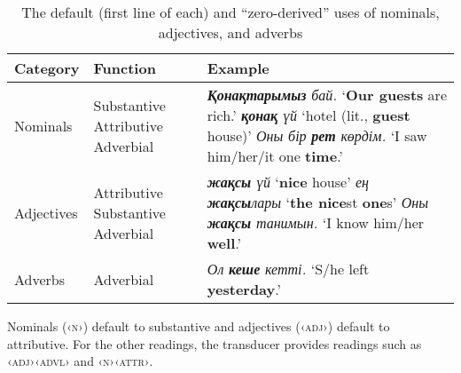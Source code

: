 \documentclass[a4paper,11pt, onecolumn,twoside]{article}
\newcommand{\kazakh}[1]{{\em #1}}
\newcommand{\gloss}[1]{`#1'}
\newcommand{\tag}[1]{{\ll \textsc{‹#1›}}}
\begin{document}
\begin{table}[htbp]
	\centering
	\caption{The default (first line of each) and ``zero-derived'' uses of nominals, adjectives, and adverbs}\label{tab:zeroderiv}
	\begin{tabular}{lp{5em}p{20em}}
		\toprule
			\textbf{Category} & \textbf{Function} & \textbf{Example} \\
		\midrule
			Nominals & Substantive\newline
							Attributive\newline
							Adverbial
						& \kazakh{\textbf{Қонақтарымыз} бай.} \gloss{\textbf{Our guests} are rich.}\newline 
							\kazakh{\textbf{қонақ} үй} \gloss{hotel (lit., \textbf{guest} house)}\newline
							\kazakh{Оны бір \textbf{рет} көрдім.} \gloss{I saw him/her/it one \textbf{time}.} \\\midrule
			Adjectives & Attributive\newline
							Substantive\newline
							Adverbial
						& \kazakh{\textbf{жақсы} үй} \gloss{\textbf{nice} house} \newline
						\kazakh{ең \textbf{жақсы}лары} \gloss{\textbf{the nice}st \textbf{one}s} \newline
						\kazakh{Оны \textbf{жақсы} танимын.} \gloss{I know him/her \textbf{well}.}
						\\\midrule
			Adverbs & Adverbial
						& \kazakh{Ол \textbf{кеше} кетті.} \gloss{S/he left \textbf{yesterday}.}
						\\
		\bottomrule
	\end{tabular}

\end{table}

Nominals (\tag{n}) default to substantive and adjectives (\tag{adj}) default to attributive.  For the other readings, the transducer provides readings such as \tag{adj}\tag{advl} and \tag{n}\tag{attr}.

\end{document}
